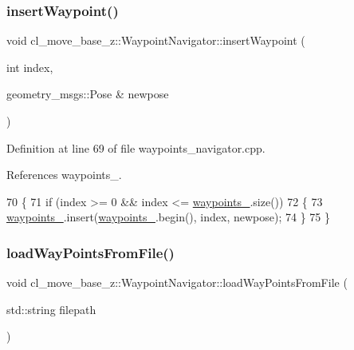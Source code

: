 \subsubsection{\texorpdfstring{insert\+Waypoint()}{insertWaypoint()}}
{\footnotesize\ttfamily void cl\+\_\+move\+\_\+base\+\_\+z\+::\+Waypoint\+Navigator\+::insert\+Waypoint (\begin{DoxyParamCaption}\item[{int}]{index,  }\item[{geometry\+\_\+msgs\+::\+Pose \&}]{newpose }\end{DoxyParamCaption})}



Definition at line 69 of file waypoints\+\_\+navigator.\+cpp.



References waypoints\+\_\+.


\begin{DoxyCode}
70 \{
71   \textcolor{keywordflow}{if} (index >= 0 && index <= \hyperlink{classcl__move__base__z_1_1WaypointNavigator_a727f6a73e15ff5dc6bb3ffdf52c3d832}{waypoints\_}.size())
72   \{
73     \hyperlink{classcl__move__base__z_1_1WaypointNavigator_a727f6a73e15ff5dc6bb3ffdf52c3d832}{waypoints\_}.insert(\hyperlink{classcl__move__base__z_1_1WaypointNavigator_a727f6a73e15ff5dc6bb3ffdf52c3d832}{waypoints\_}.begin(), index, newpose);
74   \}
75 \}
\end{DoxyCode}
\mbox{\label{classcl__move__base__z_1_1WaypointNavigator_a18d74467ddf0e637a8d5a6e1fa2e93db}} 
\subsubsection{\texorpdfstring{load\+Way\+Points\+From\+File()}{loadWayPointsFromFile()}}
{\footnotesize\ttfamily void cl\+\_\+move\+\_\+base\+\_\+z\+::\+Waypoint\+Navigator\+::load\+Way\+Points\+From\+File (\begin{DoxyParamCaption}\item[{std\+::string}]{filepath }\end{DoxyParamCaption})}



